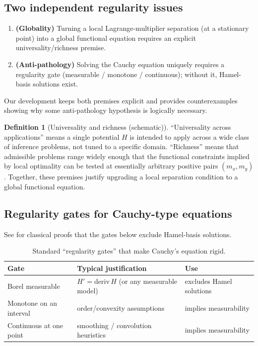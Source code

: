 \documentclass[11pt]{article}
\theoremstyle{definition}
\newtheorem{definition}[theorem]{Definition}
\theoremstyle{remark}
\begin{document}
\subsection{Two independent regularity issues}

\begin{enumerate}
\item \textbf{(Globality)} Turning a local Lagrange-multiplier separation (at a stationary point)
  into a global functional equation requires an explicit universality/richness premise.
\item \textbf{(Anti-pathology)} Solving the Cauchy equation uniquely requires a regularity gate
  (measurable / monotone / continuous); without it, Hamel-basis solutions exist.
\end{enumerate}

Our development keeps both premises explicit and provides counterexamples showing why some
anti-pathology hypothesis is logically necessary.

\begin{definition}[Universality and richness (schematic)]
``Universality across applications'' means a single potential $H$ is intended to apply across a wide class
of inference problems, not tuned to a specific domain.  ``Richness'' means that admissible problems range
widely enough that the functional constraints implied by local optimality can be tested at essentially
arbitrary positive pairs $(m_x,m_y)$.  Together, these premises justify upgrading a local separation
condition to a global functional equation.
\end{definition}

\subsection{Regularity gates for Cauchy-type equations}

See \cite{Aczel1966,Kuczma2009} for classical proofs that the gates below exclude Hamel-basis solutions.

\begin{table}[h]
\centering
\begin{tabular}{|l|l|l|}
\hline
\textbf{Gate} & \textbf{Typical justification} & \textbf{Use} \\
\hline
Borel measurable & $H'=\mathrm{deriv}\,H$ (or any measurable model) & excludes Hamel solutions \\
\hline
Monotone on an interval & order/convexity assumptions & implies measurability \\
\hline
Continuous at one point & smoothing / convolution heuristics & implies measurability \\
\hline
\end{tabular}
\caption{Standard ``regularity gates'' that make Cauchy's equation rigid.}
\end{table}
\end{document}

